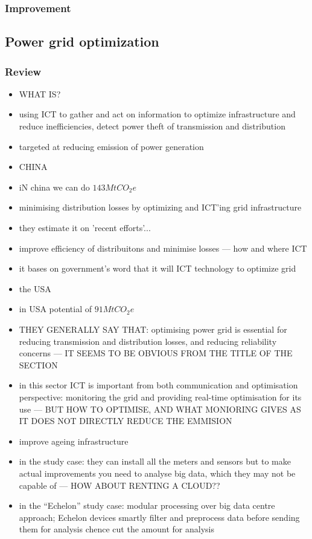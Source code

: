 \documentclass[11pt, twocolumn]{article}
\begin{document}
\subsubsection{Improvement}

\subsection{Power grid optimization}
\subsubsection{Review}
\begin{itemize}
\item WHAT IS?
\item using ICT to gather and act on information to optimize infrastructure and reduce inefficiencies, detect power theft of transmission and distribution
\item targeted at reducing emission of power generation


\item CHINA
\item iN china we can do $143 Mt CO_2e$
\item minimising distribution losses by optimizing and ICT'ing grid infrastructure
\item they estimate it on 'recent efforts'...
\item improve efficiency of distribuitons and minimise losses --- how and where ICT
\item it bases on government's word that it will ICT technology to optimize grid

\item the USA
\item in USA potential of $91 MtCO_2e$
\item THEY GENERALLY SAY THAT: optimising power grid is essential for reducing transmission and distribution losses, and reducing reliability concerns --- IT SEEMS TO BE OBVIOUS FROM THE TITLE OF THE SECTION
\item in this sector ICT is important from both communication and optimisation perspective: monitoring the grid and providing real-time optimisation for its use --- BUT HOW TO OPTIMISE, AND WHAT MONIORING GIVES AS IT DOES NOT DIRECTLY REDUCE THE EMMISION
\item improve ageing infrastructure
\item in the study case: they can install all the meters and sensors but to make actual improvements you need to analyse big data, which they may not be capable of --- HOW ABOUT RENTING A CLOUD??
\item in the ``Echelon'' study case: modular processing over big data centre approach; Echelon devices smartly filter and preprocess data before sending them for analysis chence cut the amount for analysis


\end{itemize}
\end{document}
